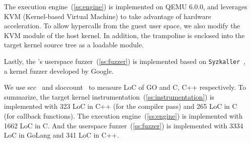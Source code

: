 The execution engine~(\autoref{ss:engine}) is implemented on QEMU
6.0.0, and leverages KVM (Kernel-based Virtual Machine) to take
advantage of hardware acceleration.
%
To allow hypercalls from the guest user space, we also modify the KVM
module of the host kernel.
%
In addition, the trampoline is enclosed into the target kernel source
tree as a loadable module.


Lastly, the \sys's userspace fuzzer~(\autoref{ss:fuzzer}) is
implemented based on \texttt{Syzkaller}~\cite{syzkaller}, a kernel
fuzzer developed by Google.



%
We use scc~\cite{scc} and sloccount~\cite{sloccount} to measure LoC of
GO and C, C++ respectively.
%
To summarize, the target kernel
instrumentation~(\autoref{ss:instrumentation}) is implemented with 323
LoC in C++ (for the compiler pass) and 265 LoC in C (for callback
functions).
%
The execution engine~(\autoref{ss:engine}) is implemented with 1662
LoC in C. And the userspace fuzzer~(\autoref{ss:fuzzer}) is
implemented with 3334 LoC in GoLang and 341 LoC in C++.








